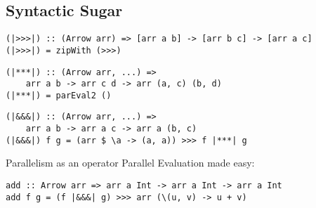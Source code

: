 \subsection{Syntactic Sugar}
\begin{frame}[fragile]
\begin{lstlisting}[frame=htrbl]
(|>>>|) :: (Arrow arr) => [arr a b] -> [arr b c] -> [arr a c]
(|>>>|) = zipWith (>>>)
\end{lstlisting}

\begin{lstlisting}[frame=htrbl]
(|***|) :: (Arrow arr, ...) =>
	arr a b -> arr c d -> arr (a, c) (b, d)
(|***|) = parEval2 ()
\end{lstlisting}

\begin{lstlisting}[frame=htrbl]
(|&&&|) :: (Arrow arr, ...) =>
	arr a b -> arr a c -> arr a (b, c)
(|&&&|) f g = (arr $ \a -> (a, a)) >>> f |***| g
\end{lstlisting}
\end{frame}

\begin{frame}[fragile]{Parallelism as an operator}
Parallel Evaluation made easy:
\begin{lstlisting}[frame=htrbl]
add :: Arrow arr => arr a Int -> arr a Int -> arr a Int
add f g = (f |&&&| g) >>> arr (\(u, v) -> u + v)
\end{lstlisting}
\end{frame}